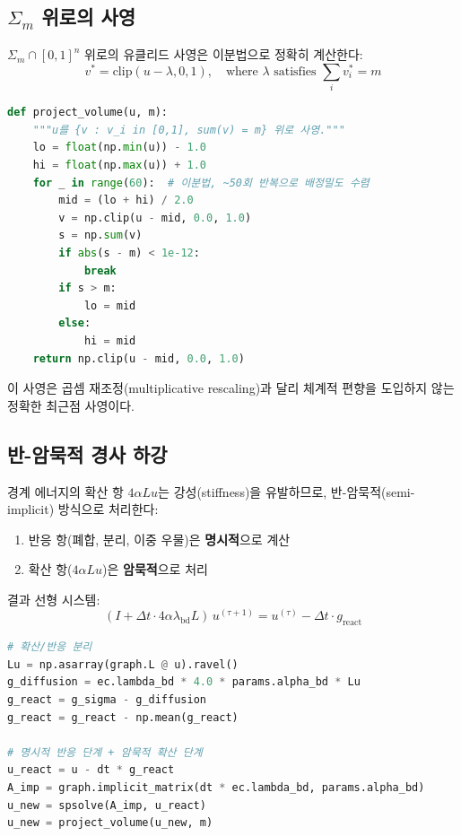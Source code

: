 \subsection{$\Sigma_m$ 위로의 사영}

$\Sigma_m \cap [0,1]^n$ 위로의 유클리드 사영은 이분법으로 정확히 계산한다:
\begin{equation}
    v^* = \mathrm{clip}(u - \lambda, 0, 1), \quad \text{where } \lambda \text{ satisfies } \sum_i v^*_i = m
\end{equation}

\begin{lstlisting}[language=Python, caption={체적 제약 사영 (optimizer.py)}]
def project_volume(u, m):
    """u를 {v : v_i in [0,1], sum(v) = m} 위로 사영."""
    lo = float(np.min(u)) - 1.0
    hi = float(np.max(u)) + 1.0
    for _ in range(60):  # 이분법, ~50회 반복으로 배정밀도 수렴
        mid = (lo + hi) / 2.0
        v = np.clip(u - mid, 0.0, 1.0)
        s = np.sum(v)
        if abs(s - m) < 1e-12:
            break
        if s > m:
            lo = mid
        else:
            hi = mid
    return np.clip(u - mid, 0.0, 1.0)
\end{lstlisting}

이 사영은 곱셈 재조정(multiplicative rescaling)과 달리 체계적 편향을 도입하지 않는 정확한 최근점 사영이다.

\subsection{반-암묵적 경사 하강}

경계 에너지의 확산 항 $4\alpha L u$는 강성(stiffness)을 유발하므로, 반-암묵적(semi-implicit) 방식으로 처리한다:
\begin{enumerate}
    \item 반응 항(폐합, 분리, 이중 우물)은 \textbf{명시적}으로 계산
    \item 확산 항($4\alpha L u$)은 \textbf{암묵적}으로 처리
\end{enumerate}

결과 선형 시스템:
\begin{equation}
    (I + \Delta t \cdot 4\alpha\lambda_{\mathrm{bd}} L) \, u^{(\tau+1)} = u^{(\tau)} - \Delta t \cdot g_{\mathrm{react}}
\end{equation}

\begin{lstlisting}[language=Python, caption={반-암묵적 단계 (optimizer.py, 핵심 루프 발췌)}]
# 확산/반응 분리
Lu = np.asarray(graph.L @ u).ravel()
g_diffusion = ec.lambda_bd * 4.0 * params.alpha_bd * Lu
g_react = g_sigma - g_diffusion
g_react = g_react - np.mean(g_react)

# 명시적 반응 단계 + 암묵적 확산 단계
u_react = u - dt * g_react
A_imp = graph.implicit_matrix(dt * ec.lambda_bd, params.alpha_bd)
u_new = spsolve(A_imp, u_react)
u_new = project_volume(u_new, m)
\end{lstlisting}

